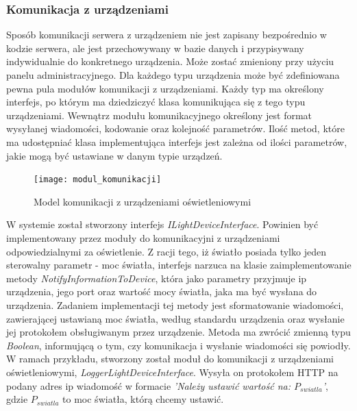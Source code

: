 \subsubsection{Komunikacja z urządzeniami}
Sposób komunikacji serwera z urządzeniem nie jest zapisany bezpośrednio w kodzie serwera, ale jest przechowywany w bazie danych i przypisywany indywidualnie do konkretnego urządzenia. Może zostać zmieniony przy użyciu panelu administracyjnego. Dla każdego typu urządzenia może być zdefiniowana pewna pula modułów komunikacji z urządzeniami. Każdy typ ma określony interfejs, po którym ma dziedziczyć klasa komunikująca się z tego typu urządzeniami. Wewnątrz modułu komunikacyjnego określony jest format wysyłanej wiadomości, kodowanie oraz kolejność parametrów. Ilość metod, które ma udostępniać klasa implementująca interfejs jest zależna od ilości parametrów, jakie mogą być ustawiane w danym typie urządzeń.
\begin{figure}[H]			
	\centering
	\caption{Model komunikacji z urządzeniami oświetleniowymi}
	\texttt{[image: modul\_komunikacji]}
\end{figure}
W systemie został stworzony interfejs \textit{ILightDeviceInterface}. Powinien być implementowany przez moduły do komunikacyjni z urządzeniami odpowiedzialnymi za oświetlenie. Z racji tego, iż światło posiada tylko jeden sterowalny parametr - moc światła, interfejs narzuca na klasie zaimplementowanie metody \textit{NotifyInformationToDevice}, która jako parametry przyjmuje ip urządzenia, jego port oraz wartość mocy światła, jaka ma być wysłana do urządzenia. Zadaniem implementacji tej metody jest sformatowanie wiadomości, zawierającej ustawianą moc światła, według standardu urządzenia oraz wysłanie jej protokołem obsługiwanym przez urządzenie. Metoda ma zwrócić zmienną typu \textit{Boolean}, informującą o tym, czy komunikacja i wysłanie wiadomości się powiodły.\\		
W ramach przykładu, stworzony został moduł do komunikacji z urządzeniami oświetleniowymi, \textit{LoggerLightDeviceInterface}. Wysyła on protokołem HTTP na podany adres ip wiadomość w formacie \textit{'Należy ustawić wartość na: $P_{swiatla}$'}, gdzie $P_{swiatla}$ to moc światła, którą chcemy ustawić.
